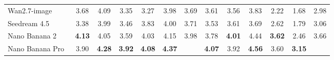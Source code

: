 \begin{table}[t]
{\begin{tabular}{l|cccccc|cccccc}
            \midrule

            Wan2.7-image~\cite{nanobananapro}
            & 3.68 & 4.09 & 3.35 & 3.27 & 3.98 & \cellcolor[HTML]{C8C8C8}3.69 & 3.61 & 3.56 & 3.83 & 2.22 & 1.68
            & \cellcolor[HTML]{C8C8C8} 2.98  \\

            Seedream 4.5~\cite{seedream2025seedream}
            & 3.38 & 3.99 & 3.46 & 3.83 & 4.00 & \cellcolor[HTML]{C8C8C8}3.71 & 3.53 & 3.61 & 3.69 & 2.62 & 1.79
            & \cellcolor[HTML]{C8C8C8}3.06 \\

            Nano Banana 2~\cite{gemini3pro}
            & \color[HTML]{319B62}\textbf{4.13} & 4.05 & 3.59 & 4.03 & 4.15 & \cellcolor[HTML]{C8C8C8}3.98 & 3.78 & \color[HTML]{319B62}\textbf{4.01} & 4.44 & \color[HTML]{319B62}\textbf{3.62} & 2.46
            & \cellcolor[HTML]{C8C8C8} 3.66  \\

            Nano Banana Pro~\cite{nanobananapro}
            & 3.90 & \color[HTML]{319B62}\textbf{4.28} & \color[HTML]{319B62}\textbf{3.92} & \color[HTML]{319B62}\textbf{4.08} & \color[HTML]{319B62}\textbf{4.37} & \cellcolor[HTML]{C8C8C8}{\color[HTML]{319B62}\textbf{4.09}} & \color[HTML]{319B62}\textbf{4.07} & 3.92 & \color[HTML]{319B62}\textbf{4.56} & 3.60 & \color[HTML]{319B62}\textbf{3.15}
            & \cellcolor[HTML]{C8C8C8}{\color[HTML]{319B62}\textbf{3.84}} \\

            

            \bottomrule
        \end{tabular}%
    }
    \vspace{-1.0em}
\end{table}